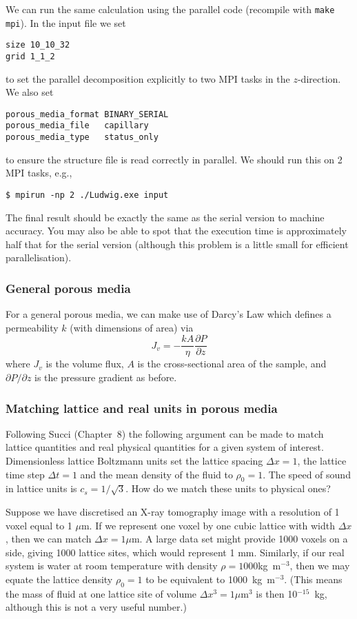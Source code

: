 We can run the same calculation using the parallel code (recompile
with \texttt{make mpi}). In the input file we set
\begin{lstlisting}
size 10_10_32
grid 1_1_2
\end{lstlisting}
to set the parallel decomposition explicitly to two MPI tasks in the
$z$-direction. We also set
\begin{lstlisting}
porous_media_format BINARY_SERIAL
porous_media_file   capillary
porous_media_type   status_only
\end{lstlisting}
to ensure the structure file is read correctly in parallel.
We should run this on 2 MPI tasks, e.g.,
\begin{lstlisting}
$ mpirun -np 2 ./Ludwig.exe input
\end{lstlisting}
The final result should be exactly the same as the serial version
to machine accuracy. You may also be able to spot that the execution
time is approximately half that for the serial version (although this
problem is a little small for efficient parallelisation).

\subsubsection{General porous media}

For a general porous media, we can make use of Darcy's Law which
defines a permeability $k$ (with dimensions of area) via
\begin{equation}
J_v = - \frac{k A}{\eta} \frac{\partial P}{\partial z}
\end{equation}
where $J_v$ is the volume flux, $A$ is the cross-sectional area
of the sample, and $\partial P / \partial z$ is the pressure gradient
as before. 


\subsubsection{Matching lattice and real units in porous media}


Following Succi \cite{succi} (Chapter~8) the following argument
can be made to match lattice quantities and real physical
quantities for a given system of interest.
Dimensionless lattice Boltzmann units set the lattice spacing
$\Delta x = 1$, the lattice time step $\Delta t = 1$ and the
mean density of the fluid to $\rho_0 = 1$. The speed of sound
in lattice units is $c_s = 1/ \sqrt{3}$. How do we match these
units to physical ones?

Suppose we have discretised an X-ray tomography image with a resolution
of 1 voxel equal to 1 $\mu$m. If we represent one voxel by one cubic
lattice with width $\Delta x$, then we can match $\Delta x = 1\mu$m. A
large data set might provide 1000 voxels on a side, giving
1000 lattice sites, which would represent 1 mm.
Similarly, if our real system is water at room temperature with density
$\rho = 1000$kg~m$^{-3}$, then we may equate the lattice density
$\rho_0 = 1$ to be equivalent to 1000~kg~m$^{-3}$. (This means the
mass of fluid at one lattice site of volume $\Delta x^3 = 1 \mu$m$^{3}$
is then 10$^{-15}$~kg, although this is not a very useful number.)

